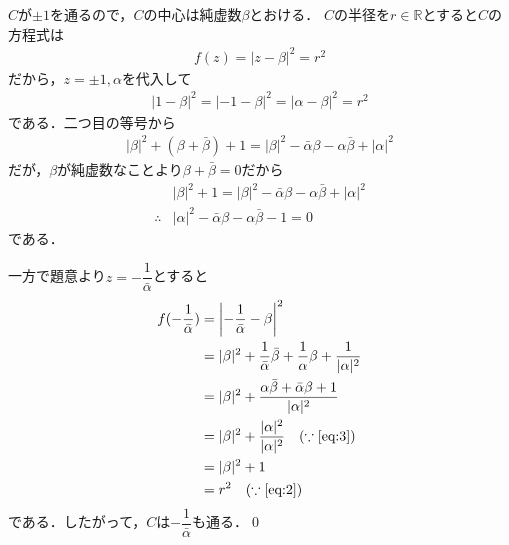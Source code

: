 \documentclass[../../main.tex]{subfiles}
\begin{document}
$C$が$\pm1$を通るので，$C$の中心は純虚数$\beta$とおける．
$C$の半径を$r\in\mathbb{R}$とすると$C$の方程式は
\begin{align}
  f(z)= |z-\beta|^2=r^2 \label{eq:1}
\end{align}
だから，$z=\pm1, \alpha$を代入して
\begin{align}
  |1-\beta|^2=|-1-\beta|^2=|\alpha-\beta|^2=r^2 \label{eq:2}
\end{align}
である．二つ目の等号から
\begin{align}
  |\beta|^2+(\beta+\bar\beta)+1=|\beta|^2-\bar\alpha\beta-\alpha\bar\beta+|\alpha|^2
\end{align}
だが，$\beta$が純虚数なことより$\beta+\bar\beta=0$だから
\begin{align}
  & |\beta|^2+1=|\beta|^2-\bar\alpha\beta-\alpha\bar\beta+|\alpha|^2 \\
  \therefore
  & |\alpha|^2-\bar\alpha\beta-\alpha\bar\beta-1 = 0 \label{eq:3}
\end{align}
である．

一方で題意より$z=-\dfrac{1}{\bar\alpha}$とすると
\begin{align}
  f(-\dfrac{1}{\bar\alpha})
  &=\left|-\dfrac{1}{\bar\alpha}-\beta\right|^2 \\
  &=|\beta|^2+\dfrac{1}{\bar\alpha}\bar\beta+\dfrac{1}{\alpha}\beta+\dfrac{1}{|\alpha|^2} \\
  &=|\beta|^2+\dfrac{\alpha\bar\beta + \bar\alpha \beta + 1}{|\alpha|^2} \\
  &=|\beta|^2+\dfrac{|\alpha|^2}{|\alpha|^2} \quad (\because\text{\cref{eq:3}}) \\
  &=|\beta|^2+1 \\
  &=r^2 \quad (\because\text{\cref{eq:2}})
\end{align}
である．したがって，$C$は$-\dfrac{1}{\bar\alpha}$も通る．\qed

\newpage
\end{document}
